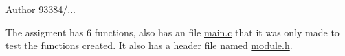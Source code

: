 \begin{DoxyAuthor}{Author}
93384/...
\end{DoxyAuthor}
The assigment has 6 functions, also has an file \mbox{\hyperlink{main_8c}{main.\+c}} that it was only made to test the functions created. It also has a header file named \mbox{\hyperlink{module_8h}{module.\+h}}. 